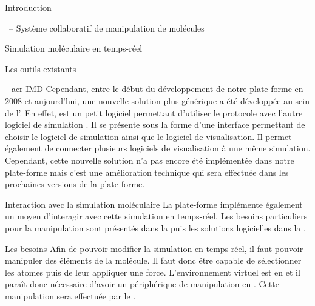 \documentclass[myfrancais]{mythesis}
\begin{document}
\begin{mypart}{Introduction}
\begin{mychapter}{\myShaddock\ -- Système collaboratif de manipulation de molécules}
\begin{mysection}{Simulation moléculaire en temps-réel}
\begin{mysubsection}{Les outils existants}
\begin{mysubsubsection}{\myacronl+{acr-IMD}}
						Cependant, entre le début du développement de notre plate-forme en 2008 et aujourd'hui, une nouvelle solution plus générique a été développée au sein de l'.
						En effet, \myMDDriver {} est un petit logiciel permettant d'utiliser le protocole  avec l'autre logiciel de simulation \myGromacs.
						Il se présente sous la forme d'une interface permettant de choisir le logiciel de simulation ainsi que le logiciel de visualisation.
						Il permet également de connecter plusieurs logiciels de visualisation à une même simulation.
						Cependant, cette nouvelle solution n'a pas encore été implémentée dans notre plate-forme mais c'est une amélioration technique qui sera effectuée dans les prochaines versions de la plate-forme.
					\end{mysubsubsection}
				\end{mysubsection}
			\end{mysection}
			\begin{mysection}{Interaction avec la simulation moléculaire}
				La plate-forme \myShaddock implémente également un moyen d'interagir avec cette simulation en temps-réel.
				Les besoins particuliers pour la manipulation sont présentés dans la  puis les solutions logicielles dans la .
				\begin{mysubsection}{Les besoins}
					Afin de pouvoir modifier la simulation en temps-réel, il faut pouvoir manipuler des éléments de la molécule.
					Il faut donc être capable de sélectionner les atomes puis de leur appliquer une force.
					L'environnement virtuel est en \myThreeD et il paraît donc nécessaire d'avoir un périphérique de manipulation en \myThreeD.
					Cette manipulation sera effectuée par le \myOmni {}.


\end{mysubsection}
\end{mysection}
\end{mychapter}
\end{mypart}
\end{document}
